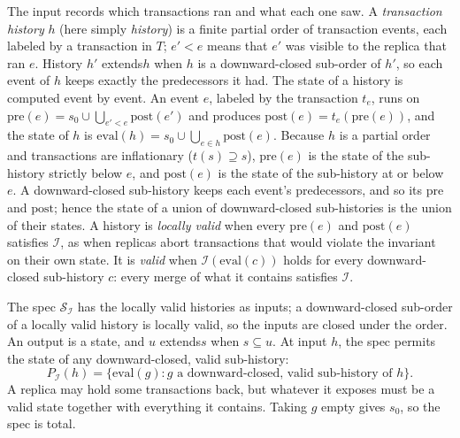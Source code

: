 \documentclass[sigconf]{cidr-2027}
\theoremstyle{remark}
\newcommand{\inrel}{extends\xspace}          %
\newcommand{\outrel}{extends\xspace}          %
\newcommand{\Spec}{\mathcal{S}}
\begin{document}
\color{blue!70!black}The input records which transactions ran and what each one saw.  A
\emph{transaction history} $h$ (here simply \emph{history}) is a finite
partial order of transaction events, each labeled by a transaction in $T$;
$e'<e$ means that $e'$ was visible to the replica that ran $e$.  History $h'$
\inrel $h$ when $h$ is a downward-closed sub-order of $h'$, so each event of
$h$ keeps exactly the predecessors it had.  The state of a history is computed
event by event.  An event $e$, labeled by the transaction $t_e$, runs on
$\mathrm{pre}(e)=s_0\cup\bigcup_{e'<e}\mathrm{post}(e')$ and produces
$\mathrm{post}(e)=t_e(\mathrm{pre}(e))$, and the state of $h$ is
$\mathrm{eval}(h)=s_0\cup\bigcup_{e\in h}\mathrm{post}(e)$.  Because $h$ is a
partial order and transactions are inflationary ($t(s)\supseteq s$),
$\mathrm{pre}(e)$ is the state of the sub-history strictly below $e$, and
$\mathrm{post}(e)$ is the state of the sub-history at or below $e$.  A
downward-closed sub-history keeps each event's predecessors, and so its
$\mathrm{pre}$ and $\mathrm{post}$; hence the state of a union of
downward-closed sub-histories is the union of their states.  A history is
\emph{locally valid} when every $\mathrm{pre}(e)$ and $\mathrm{post}(e)$
satisfies $\mathcal I$, as when replicas abort transactions that would violate
the invariant on their own state.  It is \emph{valid} when
$\mathcal I(\mathrm{eval}(c))$ holds for every downward-closed sub-history
$c$: every merge of what it contains satisfies $\mathcal I$.\color{black}

\color{blue!70!black}The spec $\Spec_{\mathcal I}$ has the locally valid histories as inputs;
a downward-closed sub-order of a locally valid history is locally valid, so the
inputs are closed under the order.
An output is a state, and $u$ \outrel $s$ when $s\subseteq u$.  At input $h$,
the spec permits the state of any downward-closed, valid sub-history:
\[
  P_{\mathcal I}(h)=\{\mathrm{eval}(g):g\text{ a downward-closed, valid
  sub-history of }h\}.
\]
A replica may hold some transactions back, but whatever it exposes must be a
valid state together with everything it contains.  Taking $g$ empty gives
$s_0$, so the spec is total.\color{black}
\end{document}
